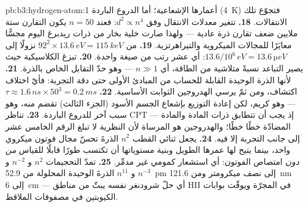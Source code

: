 \begin{solution}{pb:b3:hydrogen-atom:1}
أعمارها الإشعاعية؛ أما الدروع الباردة (\qty{4}{K}) فتجوّع تلك
الانتقالات.
\textbf{18.} تتغير معدلات الانتقال وفق $d^2 \propto n^4$: فعند $n =
50$ يكون التقارن ستة ملايين ضعف تقارن ذرة عادية --- ولهذا صارت
خلية بخار من ذرات ريدبرغ اليوم مجسًّا معايَرًا للمجالات الميكروية
والتيراهرتزية.
\textbf{19.} من $92^2 \times \qty{13.6}{eV} = \qty{115}{keV}$ نزولًا إلى
$13.6/10^6\,\unit{eV} = \qty{13.6}{\micro eV}$: أي عشر رتب
من صيغة واحدة.
\textbf{20.} تبزغ الكلاسيكية حيث يصير التباعد نسبةً
متلاشية من الطاقة، أي $n \gg 1$ --- وهو حدّ التقابل الخاص
بالذرة.
\textbf{21.} لأنها الذرة الوحيدة القابلة للحساب من المبادئ الأولى
حتى دقة التجربة: فأيّ اختلاف اكتشاف، ومن ثمّ يرسي
الهدروجين الثوابت الأساسية.
\textbf{22.} $\tau \approx 1.6\,\unit{ns} \times 50^3 =
\qty{0.2}{ms}$ --- وهو كريم، لكن إعادة التوزيع بإشعاع الجسم الأسود
(الجزء الثالث) تقضم منه، وهو سبب آخر للدروع الباردة.
\textbf{23.} تناظر CPT --- إذ يجب أن تتطابق ذرات المادة والمادة
المضادّة خطًا خطًا؛ والهدروجين هو المرساة لأن النظرية لا تبلغ
الرقم الخامس عشر إلى جانب التجربة إلا فيه.
\textbf{24.} يجعل ثنائي القطب $n^2$ الذرةَ تحسّ مجال
فوتون ميكروي واحد، بينما يتيح لها عمرها الطويل وبنية مستوياتها
أن تكتسب طورًا قابلًا للقياس \emph{من دون}
امتصاص الفوتون: أي استشعار كمومي غير مدمِّر.
\textbf{25.} تمدّ التحجيمات $n^2$ و $n^{-2}$ و $n^{-3}$ و $n^{11}$
الذرةَ الوحيدة المحلولة من \qty{52.9}{pm} إلى نصف ميكرومتر ومن
\qty{121.6}{nm} إلى \qty{6}{cm} --- أي حلّ شرودنغر
نفسه يبثّ من مناطق HII في المجرّة ويوقّت
بوابات الكيوبتين في مصفوفات الملاقط.
\end{solution}

